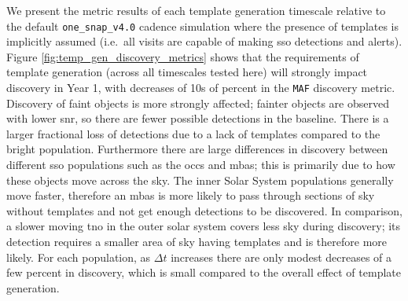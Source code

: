 \documentclass[preprintm,linenumbers]{aastex631}
\newcommand{\baseline}{\texttt{one\_snap\_v4.0}\xspace}
\newcommand{\maf}{\texttt{MAF}\xspace}
\begin{document}
        We present the metric results of each template generation timescale relative to the default \baseline cadence simulation where the presence of templates is implicitly assumed (i.e.\ all visits are capable of making \gls*{sso} detections and alerts).
  Figure \ref{fig:temp_gen_discovery_metrics} shows that the requirements of template generation (across all timescales tested here) will strongly impact discovery in Year 1, with decreases of 10s of percent in the \maf discovery metric.
Discovery of faint objects is more strongly affected; fainter objects are observed with lower \gls*{snr}, so there are fewer possible detections in the baseline.
There is a larger fractional loss of detections due to a lack of templates compared to the bright population.
  Furthermore there are large differences in discovery between different \gls*{sso} populations such as the \glspl*{occ} and \glspl*{mba}; this is primarily due to how these objects move across the sky.
  The inner Solar System populations generally move faster, therefore an \glspl*{mba} is more likely to pass through sections of sky without templates and not get enough detections to be discovered.
  In comparison, a slower moving \gls*{tno} in the outer solar system covers less sky during discovery; its detection requires a smaller area of sky having templates and is therefore more likely.
  For each population, as $\Delta t$ increases there are only modest decreases of a few percent in discovery, which is small compared to the overall effect of template generation.
  
\end{document}
